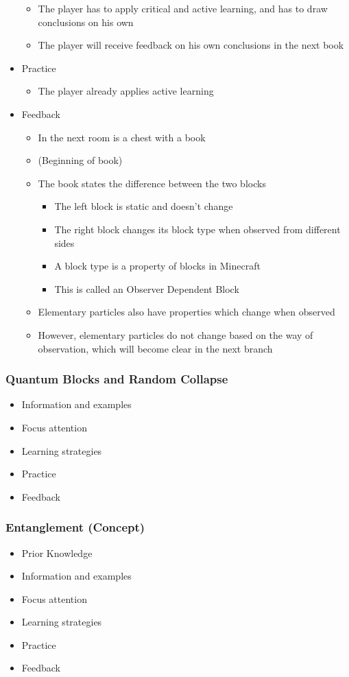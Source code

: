 \documentclass[11pt,twoside]{report} %
\begin{document}
\begin{itemize}
\begin{itemize}
			\item The player has to apply critical and active learning, and has to draw conclusions on his own
			\item The player will receive feedback on his own conclusions in the next book
		\end{itemize}
		\item Practice
		\begin{itemize}
			\item The player already applies active learning
		\end{itemize}
		\item Feedback
		\begin{itemize}
			\item In the next room is a chest with a book
			\item (Beginning of book)
			\item The book states the difference between the two blocks
			\begin{itemize}
				\item The left block is static and doesn't change
				\item The right block changes its block type when observed from different sides
				\item A block type is a property of blocks in Minecraft
				\item This is called an Observer Dependent Block
			\end{itemize}
			\item Elementary particles also have properties which change when observed
			\item However, elementary particles do not change based on the way of observation, which will become clear in the next branch
		\end{itemize}
	\end{itemize}
\subsubsection{Quantum Blocks and Random Collapse}
	\begin{itemize}
		\item Information and examples
		\item Focus attention
		\item Learning strategies
		\item Practice
		\item Feedback
	\end{itemize}
\subsubsection{Entanglement (Concept)}
	\begin{itemize}
		\item Prior Knowledge
		\item Information and examples
		\item Focus attention
		\item Learning strategies
		\item Practice
		\item Feedback
	\end{itemize}
\end{document}
